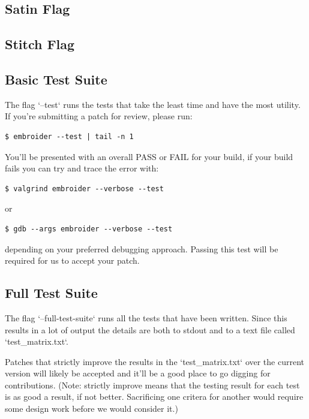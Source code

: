 \documentclass[a4paper]{report}
\begin{document}
\subsection{Satin Flag}

\subsection{Stitch Flag}

\subsection{Basic Test Suite}

The flag `--test` runs the tests that take the least time and have the most utility. If you're submitting a patch for review, please run:

\begin{lstlisting}
$ embroider --test | tail -n 1
\end{lstlisting}

You'll be presented with an overall PASS or FAIL for your build,
if your build fails you can try and trace the error with:

\begin{lstlisting}
$ valgrind embroider --verbose --test
\end{lstlisting}

or

\begin{lstlisting}
$ gdb --args embroider --verbose --test
\end{lstlisting}

depending on your preferred debugging approach. Passing this test
will be required for us to accept your patch.

\subsection{Full Test Suite}

The flag `--full-test-suite` runs all the tests that have been written.
Since this results in a lot of output the details are both to stdout
and to a text file called `test\_matrix.txt`.

Patches that strictly improve the results in the `test\_matrix.txt` over
the current version will likely be accepted and it'll be a good place
to go digging for contributions. (Note: strictly improve means that
the testing result for each test is as good a result, if not better.
Sacrificing one critera for another would require some design work
before we would consider it.)
\end{document}
